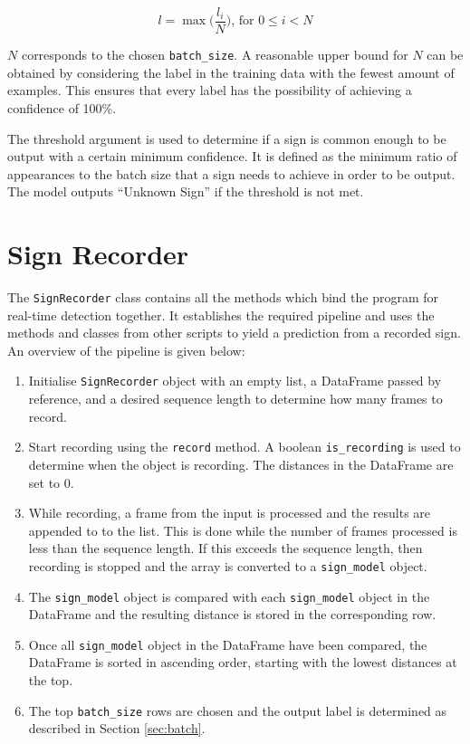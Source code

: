 \documentclass[final,rdr32.tex]{subfiles}
\begin{document}
\begin{equation*}
    l = \max\Big(\frac{l_i}{N}\Big) \text{, for $0 \leq i < N$}
\end{equation*}

$N$ corresponds to the chosen \verb|batch_size|. A reasonable upper bound for $N$ can be obtained by considering the label in the training data with the fewest amount of examples. This ensures that every label has the possibility of achieving a confidence of 100\%.

The threshold argument is used to determine if a sign is common enough to be output with a certain minimum confidence. It is defined as the minimum ratio of appearances to the batch size that a sign needs to achieve in order to be output.
The model outputs ``Unknown Sign'' if the threshold is not met.

\section{Sign Recorder}
\label{sec:sign_recorder}

The \verb|SignRecorder| class contains all the methods which bind the program for real-time detection together. It establishes the required pipeline and uses the methods and classes from other scripts to yield a prediction from a recorded sign. An overview of the pipeline is given below:

\begin{enumerate}
    \item Initialise \verb|SignRecorder| object with an empty list, a DataFrame passed by reference, and a desired sequence length to determine how many frames to record.
    \item Start recording using the \verb|record| method. A boolean \verb|is_recording| is used to determine when the object is recording. The distances in the DataFrame are set to 0.
    \item While recording, a frame from the input is processed and the results are appended to to the list. This is done while the number of frames processed is less than the sequence length. If this exceeds the sequence length, then recording is stopped and the array is converted to a \verb|sign_model| object.
    \item The \verb|sign_model| object is compared with each \verb|sign_model| object in the DataFrame and the resulting distance is stored in the corresponding row.
    \item Once all \verb|sign_model| object in the DataFrame have been compared, the DataFrame is sorted in ascending order, starting with the lowest distances at the top.
    \item The top \verb|batch_size| rows are chosen and the output label is determined as described in Section \ref{sec:batch}.
\end{enumerate}
\end{document}
